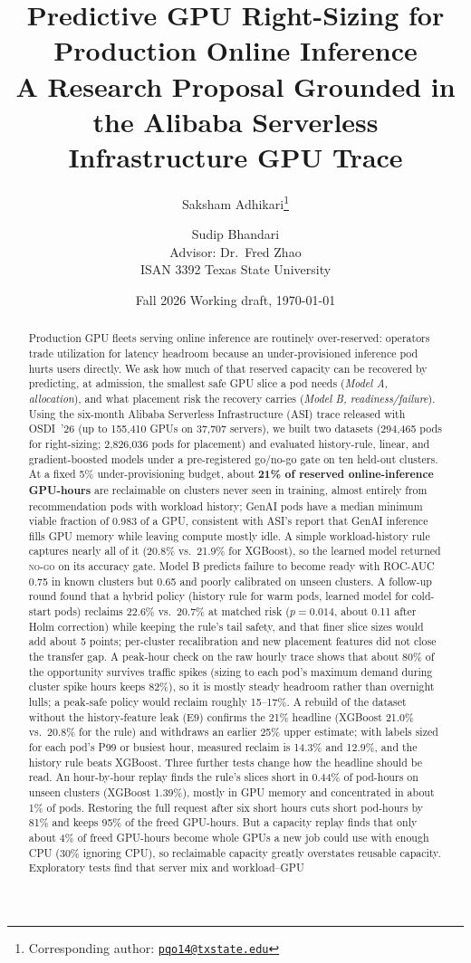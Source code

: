 \documentclass[11pt]{article}
\title{\textbf{Predictive GPU Right-Sizing for Production Online Inference}\\[4pt]
\large A Research Proposal Grounded in the Alibaba Serverless Infrastructure GPU Trace}
\author{Saksham Adhikari\thanks{Corresponding author: \href{mailto:pqo14@txstate.edu}{\texttt{pqo14@txstate.edu}}} \and Sudip Bhandari\\[4pt]
\normalsize Advisor: Dr.\ Fred Zhao\\[2pt]
\normalsize ISAN 3392 \textbullet{} Texas State University}
\date{Fall 2026 \textbullet{} Working draft, \today}
\begin{document}
\maketitle

\begin{abstract}
\noindent Production GPU fleets serving online inference are routinely over-reserved: operators trade utilization for latency headroom because an under-provisioned inference pod hurts users directly. We ask how much of that reserved capacity can be recovered by predicting, at admission, the smallest safe GPU slice a pod needs (\emph{Model A, allocation}), and what placement risk the recovery carries (\emph{Model B, readiness/failure}). Using the six-month Alibaba Serverless Infrastructure (ASI) trace released with OSDI~'26 (up to 155{,}410 GPUs on 37{,}707 servers), we built two datasets (294{,}465 pods for right-sizing; 2{,}826{,}036 pods for placement) and evaluated history-rule, linear, and gradient-boosted models under a pre-registered go/no-go gate on ten held-out clusters. At a fixed 5\% under-provisioning budget, about \textbf{21\% of reserved online-inference GPU-hours} are reclaimable on clusters never seen in training, almost entirely from recommendation pods with workload history; GenAI pods have a median minimum viable fraction of 0.983 of a GPU, consistent with ASI's report that GenAI inference fills GPU memory while leaving compute mostly idle. A simple workload-history rule captures nearly all of it (20.8\% vs.\ 21.9\% for XGBoost), so the learned model returned \textsc{no-go} on its accuracy gate. Model B predicts failure to become ready with ROC-AUC 0.75 in known clusters but 0.65 and poorly calibrated on unseen clusters. A follow-up round found that a hybrid policy (history rule for warm pods, learned model for cold-start pods) reclaims 22.6\% vs.\ 20.7\% at matched risk ($p = 0.014$, about 0.11 after Holm correction) while keeping the rule's tail safety, and that finer slice sizes would add about 5 points; per-cluster recalibration and new placement features did not close the transfer gap. A peak-hour check on the raw hourly trace shows that about 80\% of the opportunity survives traffic spikes (sizing to each pod's maximum demand during cluster spike hours keeps 82\%), so it is mostly steady headroom rather than overnight lulls; a peak-safe policy would reclaim roughly 15--17\%. A rebuild of the dataset without the history-feature leak (E9) confirms the 21\% headline (XGBoost 21.0\% vs.\ 20.8\% for the rule) and withdraws an earlier 25\% upper estimate; with labels sized for each pod's P99 or busiest hour, measured reclaim is 14.3\% and 12.9\%, and the history rule beats XGBoost. Three further tests change how the headline should be read. An hour-by-hour replay finds the rule's slices short in 0.44\% of pod-hours on unseen clusters (XGBoost 1.39\%), mostly in GPU memory and concentrated in about 1\% of pods. Restoring the full request after six short hours cuts short pod-hours by 81\% and keeps 95\% of the freed GPU-hours. But a capacity replay finds that only about 4\% of freed GPU-hours become whole GPUs a new job could use with enough CPU (30\% ignoring CPU), so reclaimable capacity greatly overstates reusable capacity. Exploratory tests find that server mix and workload--GPU 
\end{abstract}
\end{document}
